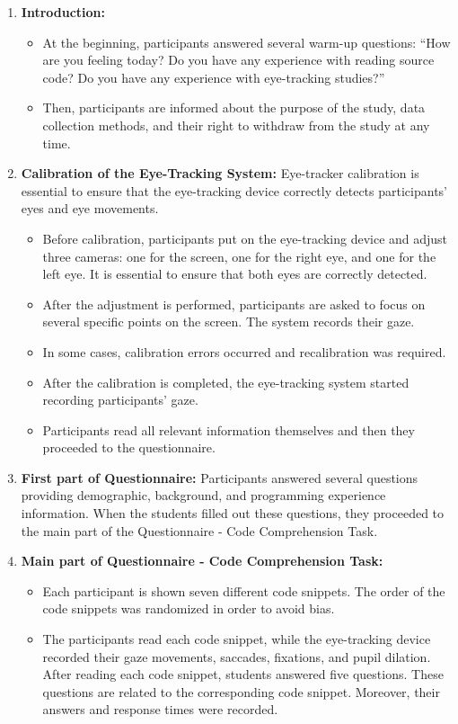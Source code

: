 \begin{enumerate}
    \item \textbf{Introduction:}
    \begin{itemize}
        \item At the beginning, participants answered several warm-up questions: “How are you feeling today? Do you have any experience with reading source code? Do you have any experience with eye-tracking studies?”
        \item Then, participants are informed about the purpose of the study, data collection methods, and their right to withdraw from the study at any time.
    \end{itemize}

    \item \textbf{Calibration of the Eye-Tracking System:} 
    Eye-tracker calibration is essential to ensure that the eye-tracking device correctly detects participants’ eyes and eye movements.
    \begin{itemize}
        \item Before calibration, participants put on the eye-tracking device and adjust three cameras: one for the screen, one for the right eye, and one for the left eye. It is essential to ensure that both eyes are correctly detected.
        \item After the adjustment is performed, participants are asked to focus on several specific points on the screen. The system records their gaze.
        \item In some cases, calibration errors occurred and recalibration was required.
        \item After the calibration is completed, the eye-tracking system started recording participants’ gaze.
        \item Participants read all relevant information themselves and then they proceeded to the questionnaire.
    \end{itemize}
    
    \item \textbf{First part of Questionnaire:}  
    Participants answered several questions providing demographic, background, and programming experience information. When the students filled out these questions, they proceeded to the main part of the Questionnaire - Code Comprehension Task.

    \item \textbf{Main part of Questionnaire - Code Comprehension Task:}
    \begin{itemize}
        \item Each participant is shown seven different code snippets. The order of the code snippets was randomized in order to avoid bias.
        \item The participants read each code snippet, while the eye-tracking device recorded their gaze movements, saccades, fixations, and pupil dilation. After reading each code snippet, students answered five questions. These questions are related to the corresponding code snippet. Moreover, their answers and response times were recorded.
    \end{itemize}


\end{enumerate}
